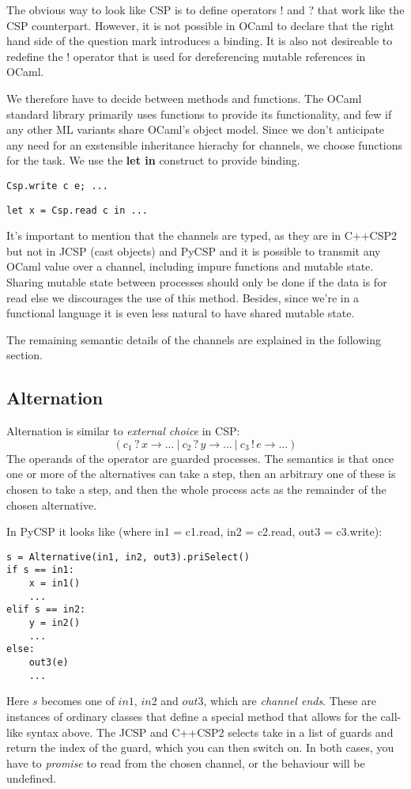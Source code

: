 \documentclass[a4paper,12pt]{article}
\begin{document}
The obvious way to look like CSP is to define operators ! and ? that work like the
CSP counterpart. However, it is not possible in OCaml to declare that the right hand 
side of the question mark introduces a binding. It is also not desireable to redefine
the ! operator that is used for dereferencing mutable references in OCaml.

We therefore have to decide between methods and functions. The OCaml standard library
primarily uses functions to provide its functionality, and few if any other ML 
variants share OCaml's object model. Since we don't anticipate any need for an
exstensible inheritance hierachy for channels, we choose functions for the task.
We use the \textbf{let in} construct to provide binding.

\begin{verbatim}
Csp.write c e; ...
\end{verbatim}
\begin{verbatim}
let x = Csp.read c in ...
\end{verbatim}

It's important to mention that the channels are typed, as they are in C++CSP2
but not in JCSP (cast objects) and PyCSP and it is possible to transmit any
OCaml value over a channel, including impure functions and mutable state.
Sharing mutable state between processes should only be done if the data is for
read else we discourages the use of this method. Besides, since we're in a
functional language it is even less natural to have shared mutable state.

The remaining semantic details of the channels are explained in the following
section.

\subsection{Alternation}
Alternation is similar to \emph{external choice} in CSP:
\[(c_1\,?\,x \to ...\ |\ c_2\,?\,y \to ...\ |\ c_3\,!\,e \to ...)\]
The operands of the operator are guarded processes. The semantics is that once one or 
more of the alternatives can take a step, then an arbitrary one of these is chosen to take a 
step, and then the whole process acts as the remainder of the chosen alternative.

In PyCSP it looks like (where in1 = c1.read, in2 = c2.read, out3 = c3.write):
\begin{verbatim}
s = Alternative(in1, in2, out3).priSelect()
if s == in1:
    x = in1()
    ...
elif s == in2:
    y = in2()
    ...
else:
    out3(e)
    ...
\end{verbatim}
Here $s$ becomes one of $in1$, $in2$ and $out3$, which are \emph{channel ends}. These are instances
of ordinary classes that define a special method that allows for the call-like syntax above.
The JCSP and C++CSP2 selects take in a list of guards and return the index of the guard, which you can 
then switch on. In both cases, you have to \emph{promise} to read from the chosen channel, or the 
behaviour will be undefined.
\end{document}
